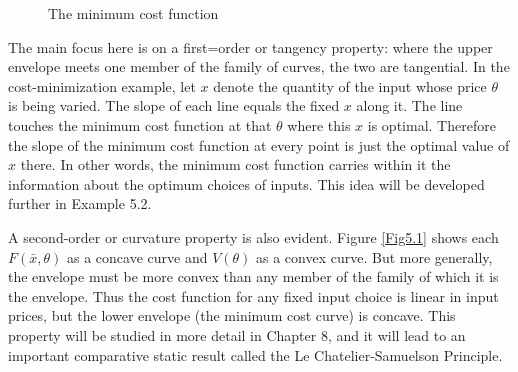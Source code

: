 \begin{figure}[!htb] %
\centering %
\caption{The minimum cost function} %
\label{Fig5.2} %
\end{figure}

The main focus here is on a first=order or tangency property: where the upper envelope meets one member of the family of curves, the two are tangential. In the cost-minimization example, let $x$ denote the quantity of the input whose price $\theta$ is being varied. The slope of each line equals the fixed $x$ along it. The line touches the minimum cost function at that $\theta$ where this $x$ is optimal. Therefore the slope of the minimum cost function at every point is just the optimal value of $x$ there. In other words, the minimum cost function carries within it the information about the optimum choices of inputs. This idea will be developed further in Example 5.2.

A second-order or curvature property is also evident. Figure \ref{Fig5.1} shows each $F(\bar{x}, \theta)$ as a concave curve and $V(\theta)$ as a convex curve. But more generally, the envelope must be more convex than any member of the family of which it is the envelope. Thus the cost function for any fixed input choice is linear in input prices, but the lower envelope (the minimum cost curve) is concave. This property will be studied in more detail in Chapter 8, and it will lead to an important comparative static result called the Le Chatelier-Samuelson Principle.

